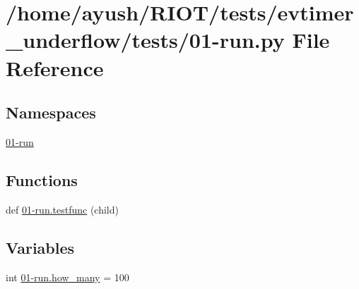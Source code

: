 \hypertarget{evtimer__underflow_2tests_201-run_8py}{}\section{/home/ayush/\+R\+I\+O\+T/tests/evtimer\+\_\+underflow/tests/01-\/run.py File Reference}
\label{evtimer__underflow_2tests_201-run_8py}
\subsection*{Namespaces}
\begin{DoxyCompactItemize}
\item 
 \hyperlink{namespace01-run}{01-\/run}
\end{DoxyCompactItemize}
\subsection*{Functions}
\begin{DoxyCompactItemize}
\item 
def \hyperlink{namespace01-run_aff983ffd4ab0e6bf8e7e58970e4a10bb}{01-\/run.\+testfunc} (child)
\end{DoxyCompactItemize}
\subsection*{Variables}
\begin{DoxyCompactItemize}
\item 
int \hyperlink{namespace01-run_a8435ebde0e106380ca0c31a248ff48ae}{01-\/run.\+how\+\_\+many} = 100
\end{DoxyCompactItemize}
